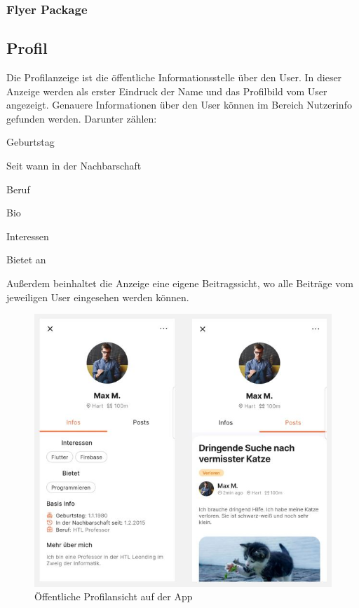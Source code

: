 \subsubsection{Flyer Package}

\subsection{Profil}
Die Profilanzeige ist die öffentliche Informationsstelle über den User. In dieser Anzeige werden als erster Eindruck der Name und das Profilbild vom User angezeigt. Genauere Informationen über den User können im Bereich Nutzerinfo gefunden werden. Darunter zählen:
\begin{compactitem}
  \item Geburtstag
  \item Seit wann in der Nachbarschaft
  \item Beruf
  \item Bio
  \item Interessen
  \item Bietet an
\end{compactitem}
Außerdem beinhaltet die Anzeige eine eigene Beitragssicht, wo alle Beiträge vom jeweiligen User eingesehen werden können.

\begin{figure}[H]
  \centering
  \includegraphics[width=\textwidth]{pics/public-profile.JPG}
  \caption{Öffentliche Profilansicht auf der App}
  \label{fig:einladecode}
\end{figure}

